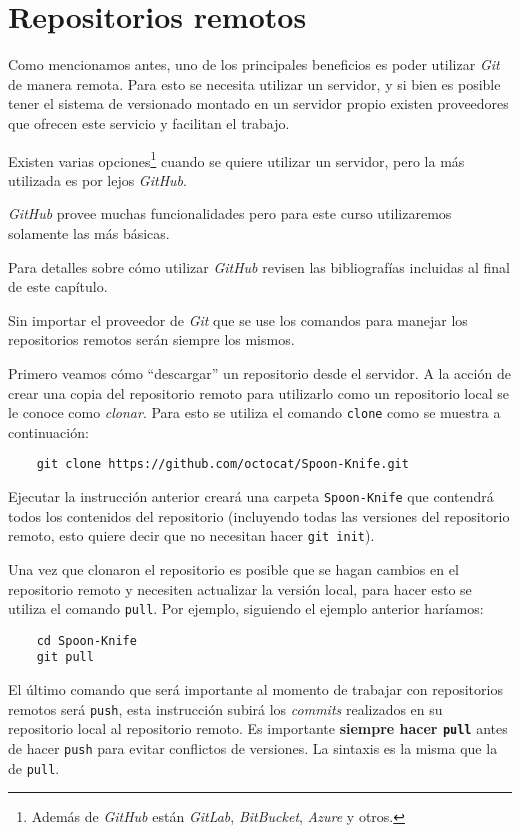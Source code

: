 \section{Repositorios remotos}
  \label{sec:github}

  Como mencionamos antes, uno de los principales beneficios es poder utilizar \textit{Git} de manera
  remota.
  Para esto se necesita utilizar un servidor, y si bien es posible tener el sistema de versionado
  montado en un servidor propio existen proveedores que ofrecen este servicio y facilitan el 
  trabajo.

  Existen varias opciones\footnote{Además de \textit{GitHub} están \textit{GitLab}, 
  \textit{BitBucket}, \textit{Azure} y otros.} cuando se quiere utilizar un servidor, pero la más 
  utilizada es por lejos \textit{GitHub}.\autocite{vcs-providers}

  \textit{GitHub} provee muchas funcionalidades pero para este curso utilizaremos solamente las más
  básicas.

  Para detalles sobre cómo utilizar \textit{GitHub} revisen las bibliografías incluidas al final de
  este capítulo.

  Sin importar el proveedor de \textit{Git} que se use los comandos para manejar los repositorios 
  remotos serán siempre los mismos.

  Primero veamos cómo \enquote{descargar} un repositorio desde el servidor.
  A la acción de crear una copia del repositorio remoto para utilizarlo como un repositorio local se
  le conoce como \textit{clonar}.
  Para esto se utiliza el comando \texttt{clone} como se muestra a continuación:
  \begin{verbatim}
    git clone https://github.com/octocat/Spoon-Knife.git
  \end{verbatim}

  Ejecutar la instrucción anterior creará una carpeta \texttt{Spoon-Knife} que contendrá todos los
  contenidos del repositorio (incluyendo todas las versiones del repositorio remoto, esto quiere 
  decir que no necesitan hacer \texttt{git init}).

  Una vez que clonaron el repositorio es posible que se hagan cambios en el repositorio remoto y 
  necesiten actualizar la versión local, para hacer esto se utiliza el comando \texttt{pull}.
  Por ejemplo, siguiendo el ejemplo anterior haríamos:
  \begin{verbatim}
    cd Spoon-Knife
    git pull
  \end{verbatim}

  El último comando que será importante al momento de trabajar con repositorios remotos será 
  \texttt{push}, esta instrucción subirá los \textit{commits} realizados en su repositorio local al
  repositorio remoto.
  Es importante \textbf{siempre hacer \texttt{pull}} antes de hacer \texttt{push} para evitar 
  conflictos de versiones.
  La sintaxis es la misma que la de \texttt{pull}.

